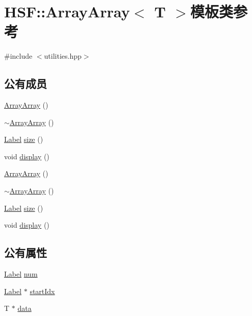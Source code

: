 \hypertarget{classHSF_1_1ArrayArray}{
\section{HSF::ArrayArray$<$ T $>$模板类参考}
\label{classHSF_1_1ArrayArray}
}


{\ttfamily \#include $<$utilities.hpp$>$}\subsection*{公有成员}
\begin{DoxyCompactItemize}
\item 
\hyperlink{classHSF_1_1ArrayArray_aa4814e95b743e62dfe9557c761c8f6ca}{ArrayArray} ()
\item 
\hyperlink{classHSF_1_1ArrayArray_aed22e3e51bb2f14c355cea6664e69601}{$\sim$ArrayArray} ()
\item 
\hyperlink{namespaceHSF_ae65d72be782e989396ebe5ec6ae4c2b6}{Label} \hyperlink{classHSF_1_1ArrayArray_a448ad8105dac9e2f4bb69045430b9950}{size} ()
\item 
void \hyperlink{classHSF_1_1ArrayArray_a7da595f942d46467f530f37db4402cb1}{display} ()
\item 
\hyperlink{classHSF_1_1ArrayArray_aa4814e95b743e62dfe9557c761c8f6ca}{ArrayArray} ()
\item 
\hyperlink{classHSF_1_1ArrayArray_aed22e3e51bb2f14c355cea6664e69601}{$\sim$ArrayArray} ()
\item 
\hyperlink{namespaceHSF_ae65d72be782e989396ebe5ec6ae4c2b6}{Label} \hyperlink{classHSF_1_1ArrayArray_a448ad8105dac9e2f4bb69045430b9950}{size} ()
\item 
void \hyperlink{classHSF_1_1ArrayArray_a7da595f942d46467f530f37db4402cb1}{display} ()
\end{DoxyCompactItemize}
\subsection*{公有属性}
\begin{DoxyCompactItemize}
\item 
\hyperlink{namespaceHSF_ae65d72be782e989396ebe5ec6ae4c2b6}{Label} \hyperlink{classHSF_1_1ArrayArray_adff8dc1a354edb255279c6b2599b00ae}{num}
\item 
\hyperlink{namespaceHSF_ae65d72be782e989396ebe5ec6ae4c2b6}{Label} $\ast$ \hyperlink{classHSF_1_1ArrayArray_acdc48259fcdc868c60343a60392b6089}{startIdx}
\item 
T $\ast$ \hyperlink{classHSF_1_1ArrayArray_a524244f009113389481a559bd9b26136}{data}
\end{DoxyCompactItemize}
